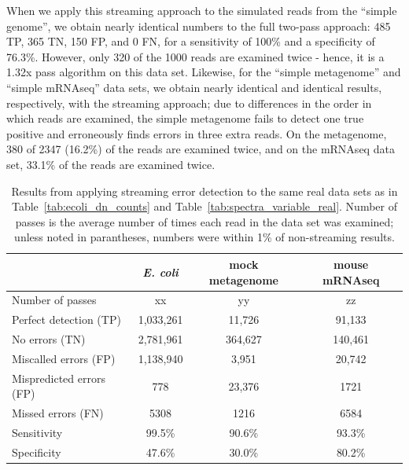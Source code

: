 \documentclass{article}
\begin{document}
When we apply this streaming approach to the simulated reads from the
``simple genome'', we obtain nearly identical numbers to the full two-pass
approach: 485 TP, 365 TN, 150 FP, and 0 FN, for a sensitivity of 100\%
and a specificity of 76.3\%.  However, only 320 of the 1000 reads are
examined twice - hence, it is a 1.32x pass algorithm on this data set.
Likewise, for the ``simple metagenome''
and ``simple mRNAseq'' data sets, we obtain nearly identical and
identical results, respectively, with the streaming approach; due to
differences in the order in which reads are examined, the simple
metagenome fails to detect one true positive and erroneously finds
errors in three extra reads.  On the metagenome, 380 of 2347 (16.2\%) of
the reads are examined twice, and on the mRNAseq data set, 33.1\% of the
reads are examined twice.




\begin{table}
\begin{tabular}{|l|c||c||c|}
\hline
& {\em E. coli} & mock metagenome & mouse mRNAseq \\
\hline
Number of passes & xx & yy & zz \\
\hline
Perfect detection (TP)   & 1,033,261 & 11,726  & 91,133 \\
No errors (TN)           & 2,781,961 & 364,627 & 140,461 \\
Miscalled errors (FP)    & 1,138,940 & 3,951   & 20,742 \\
Mispredicted errors (FP) & 778       & 23,376  & 1721 \\
Missed errors (FN)       & 5308      & 1216    & 6584 \\
\hline
Sensitivity            & 99.5\%      & 90.6\%  & 93.3\% \\
Specificity            & 47.6\%      & 30.0\%  &  80.2\% \\
\hline
\end{tabular}
\label{tab:spectra_streaming_real}

\caption{Results from applying streaming error detection to the same
  real data sets as in Table~\ref{tab:ecoli_dn_counts} and
  Table~\ref{tab:spectra_variable_real}.  Number of passes is the average
  number of times each read in the data set was examined; unless noted in
  parantheses, numbers were within 1\% of non-streaming results.}
\end{table}
\end{document}
